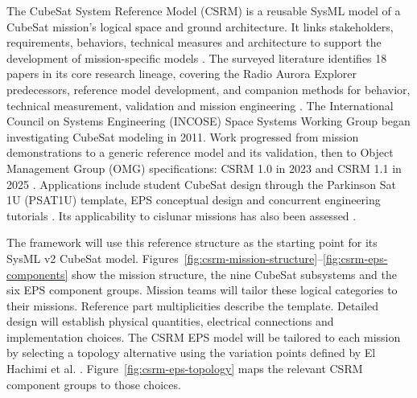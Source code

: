 \label{section:generic-cubesat-structure}

The CubeSat System Reference Model (CSRM) is a reusable SysML model of a CubeSat mission's logical space and ground architecture. It links stakeholders, requirements, behaviors, technical measures and architecture to support the development of mission-specific models \citep{kaslow2020csrm}. The surveyed literature identifies 18 papers in its core research lineage, covering the Radio Aurora Explorer predecessors, reference model development, and companion methods for behavior, technical measurement, validation and mission engineering \citep{review-1646,review-1621,review-1554,review-1563,review-1494,review-1487,review-1451,review-1446,kaslow2017status3,kaslow2017behaviors,kaslow2018verification,review-1288,kaslow2018status4,kaslow2019csrm,kaslow2020csrm,review-1051,kaslow2022mission,rudder2026metamodel}. The International Council on Systems Engineering (INCOSE) Space Systems Working Group began investigating CubeSat modeling in 2011. Work progressed from mission demonstrations to a generic reference model and its validation, then to Object Management Group (OMG) specifications: CSRM 1.0 in 2023 and CSRM 1.1 in 2025 \citep{review-1494,kaslow2019csrm,omg2023csrm,omg2025csrm}. Applications include student CubeSat design through the Parkinson Sat 1U (PSAT1U) template, EPS conceptual design and concurrent engineering tutorials \citep{review-1112,review-1009,deutsch2022comet}. Its applicability to cislunar missions has also been assessed \citep{review-0699}.

The framework will use this reference structure as the starting point for its SysML v2 CubeSat model. Figures~\ref{fig:csrm-mission-structure}--\ref{fig:csrm-eps-components} show the mission structure, the nine CubeSat subsystems and the six EPS component groups. Mission teams will tailor these logical categories to their missions. Reference part multiplicities describe the template. Detailed design will establish physical quantities, electrical connections and implementation choices.
The CSRM EPS model will be tailored to each mission by selecting a topology alternative using the variation points defined by El Hachimi et al. \citep[Fig.~1, Sec.~4]{handpicked-0003}. Figure~\ref{fig:csrm-eps-topology} maps the relevant CSRM component groups to those choices.

